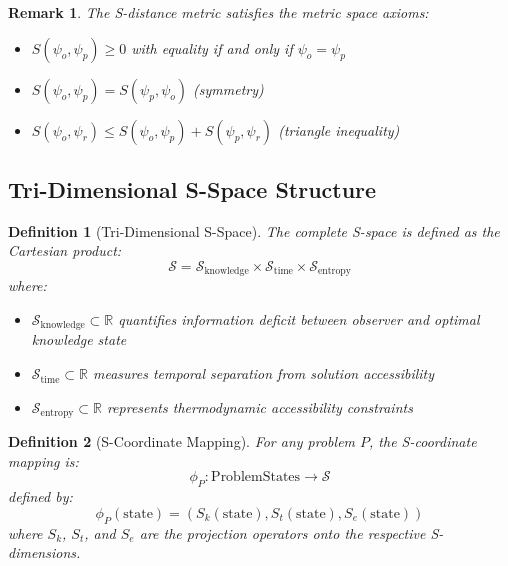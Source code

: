\documentclass[12pt,a4paper]{article}
\newtheorem{definition}{Definition}
\newtheorem{remark}{Remark}
\begin{document}
\begin{remark}
The S-distance metric satisfies the metric space axioms:
\begin{itemize}
\item $S(\psi_o, \psi_p) \geq 0$ with equality if and only if $\psi_o = \psi_p$
\item $S(\psi_o, \psi_p) = S(\psi_p, \psi_o)$ (symmetry)
\item $S(\psi_o, \psi_r) \leq S(\psi_o, \psi_p) + S(\psi_p, \psi_r)$ (triangle inequality)
\end{itemize}
\end{remark}

\subsection{Tri-Dimensional S-Space Structure}

\begin{definition}[Tri-Dimensional S-Space]
The complete S-space is defined as the Cartesian product:
\begin{equation}
\mathcal{S} = \mathcal{S}_{\text{knowledge}} \times \mathcal{S}_{\text{time}} \times \mathcal{S}_{\text{entropy}}
\end{equation}
where:
\begin{itemize}
\item $\mathcal{S}_{\text{knowledge}} \subset \mathbb{R}$ quantifies information deficit between observer and optimal knowledge state
\item $\mathcal{S}_{\text{time}} \subset \mathbb{R}$ measures temporal separation from solution accessibility
\item $\mathcal{S}_{\text{entropy}} \subset \mathbb{R}$ represents thermodynamic accessibility constraints
\end{itemize}
\end{definition}

\begin{definition}[S-Coordinate Mapping]
For any problem $P$, the S-coordinate mapping is:
\begin{equation}
\phi_P: \text{ProblemStates} \to \mathcal{S}
\end{equation}
defined by:
\begin{equation}
\phi_P(\text{state}) = (S_k(\text{state}), S_t(\text{state}), S_e(\text{state}))
\end{equation}
where $S_k$, $S_t$, and $S_e$ are the projection operators onto the respective S-dimensions.
\end{definition}
\end{document}
